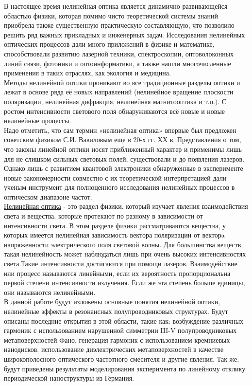 \hspace*{2mm}
В настоящее время нелинейная оптика является динамично развивающейся областью физики, которая помимо чисто теоретической системы знаний приобрела также существенную практическую составляющую, что позволило решить ряд важных прикладных и инженерных задач. Исследования нелинейных оптических процессов дали много приложений в физике и математике, способствовали развитию лазерной техники, спектроскопии, оптоволоконных линий связи, фотоники и оптоинформатики, а также нашли многочисленные применения в таких отраслях, как экология и медицина.
\\
\hspace*{2mm}
Методы нелинейной оптики проникают во все традиционные разделы оптики и лежат в основе ряда её новых направлений (нелинейное вращение плоскости поляризации, нелинейная дифракция, нелинейная магнитооптика и т.п.). С ростом интенсивности светового поля обнаруживаются всё новые и новые нелинейные процессы.
\\
\hspace*{2mm}
Надо отметить, что сам термин «нелинейная оптика» впервые был предложен советским физиком С.И. Вавиловым еще в 20-х гг. ХХ в. Представления о том, что законы линейной оптики носят приближенный характер и применимы лишь для не слишком сильных световых полей, существовали и до появления лазеров. Однако лишь с развитием квантовой электроники обнаруженные в эксперименте новые закономерности совместно с их теоретической интерпретацией дали ученым инструмент для полноценного исследования нелинейных процессов в оптическом диапазоне частот.
\\
\hspace*{2mm}
\underline{Нелинейная оптика}  - это раздел физики, который изучает явления взаимодействия света и вещества, которые протекают по разному в зависимости от интенсивности света. В этом разделе физики рассматриваются вещества, у которых имеется нелинейная зависимость вектора поляризации от векторa напряженности электрического поля световой волны. Для большинства веществ такая нелинейность может наблюдаться лишь при очень высоких интенсивностях света.Такие интенсивности достигаются при помощи лазеров.
Взаимодействие или процесс называются линейными, если их вероятность пропорциональна первой степени интенсивности излучения. Если же эта степень больше единицы, они называются нелинейными.
\\
\hspace*{2mm}
В данной работе будут изложены основные понятия нелинейной оптики, нелинейные эффекты в резонансных полупроводниковых структурах. Будут описаны последние открытия в этой области, такие как: возбуждение различных гармоник с использованием нарушенной симметрии III-V полупроводниковых метаповерхностей Фано, генерация гармоник с использованием кремниевых нанодисков, использование диэлектрических метаповерхностей в качестве широкополосного оптического частотного смесителя и другие явления. Так-же, будут приведены результаты моделирования эксперимента по линейному отклику периодической наноструктуры из Германия. 
